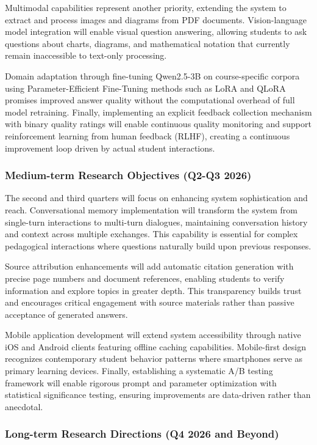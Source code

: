 \documentclass[12pt,a4paper]{article}
\begin{document}
Multimodal capabilities represent another priority, extending the system to extract and process images and diagrams from PDF documents. Vision-language model integration will enable visual question answering, allowing students to ask questions about charts, diagrams, and mathematical notation that currently remain inaccessible to text-only processing.

Domain adaptation through fine-tuning Qwen2.5-3B on course-specific corpora using Parameter-Efficient Fine-Tuning methods such as LoRA and QLoRA promises improved answer quality without the computational overhead of full model retraining. Finally, implementing an explicit feedback collection mechanism with binary quality ratings will enable continuous quality monitoring and support reinforcement learning from human feedback (RLHF), creating a continuous improvement loop driven by actual student interactions.

\subsubsection{Medium-term Research Objectives (Q2-Q3 2026)}

The second and third quarters will focus on enhancing system sophistication and reach. Conversational memory implementation will transform the system from single-turn interactions to multi-turn dialogues, maintaining conversation history and context across multiple exchanges. This capability is essential for complex pedagogical interactions where questions naturally build upon previous responses.

Source attribution enhancements will add automatic citation generation with precise page numbers and document references, enabling students to verify information and explore topics in greater depth. This transparency builds trust and encourages critical engagement with source materials rather than passive acceptance of generated answers.

Mobile application development will extend system accessibility through native iOS and Android clients featuring offline caching capabilities. Mobile-first design recognizes contemporary student behavior patterns where smartphones serve as primary learning devices. Finally, establishing a systematic A/B testing framework will enable rigorous prompt and parameter optimization with statistical significance testing, ensuring improvements are data-driven rather than anecdotal.

\subsubsection{Long-term Research Directions (Q4 2026 and Beyond)}
\end{document}
